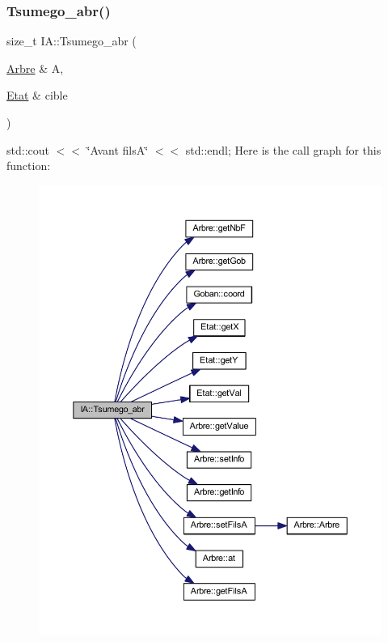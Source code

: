 \subsubsection{\texorpdfstring{Tsumego\+\_\+abr()}{Tsumego\_abr()}}
{\footnotesize\ttfamily size\+\_\+t I\+A\+::\+Tsumego\+\_\+abr (\begin{DoxyParamCaption}\item[{\hyperlink{class_arbre}{Arbre} \&}]{A,  }\item[{\hyperlink{class_etat}{Etat} \&}]{cible }\end{DoxyParamCaption})\hspace{0.3cm}{\ttfamily [static]}}

std\+::cout $<$$<$ \char`\"{}\+Avant fils\+A\char`\"{} $<$$<$ std\+::endl; Here is the call graph for this function\+:
\nopagebreak
\begin{figure}[H]
\begin{center}
\leavevmode
\includegraphics[width=350pt]{class_i_a_af1f6e5abe41a2225b17ca319c1fc0e4e_cgraph}
\end{center}
\end{figure}
